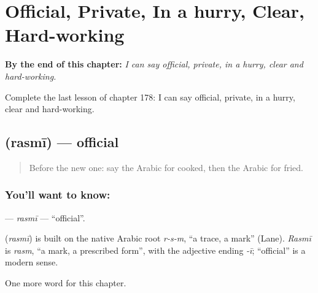 
\chapter{Official, Private, In a hurry, Clear, Hard-working}
\label{ch:ar-official-private-in-a-hurry-clear-hard-working}

\begin{chapteropening}
\textbf{By the end of this chapter:} \emph{I can say official, private, in a hurry, clear and hard-working.}

Complete the last lesson of chapter 178: I can say official, private, in a hurry, clear and hard-working.
\end{chapteropening}

\section[\texorpdfstring{\ar{رسمي} (rasmī)}{رسمي (rasmī)}]{ (rasmī) — official}

\label{lesson:AR-C178-rasmi}



\begin{quote}
Before the new one: say the Arabic for cooked, then the Arabic for fried.
\end{quote}

\subsection*{You'll want to know: }
\textbf{} — \emph{rasmī} — \textquotedblleft{}official\textquotedblright{}.

\begin{cousinweb}
\textbf{} (\emph{rasmī}) is built on the native Arabic root \emph{r-s-m}, \textquotedblleft{}a trace, a mark\textquotedblright{} (Lane). \emph{Rasmī} is \emph{rasm}, \textquotedblleft{}a mark, a prescribed form\textquotedblright{}, with the adjective ending \emph{-ī}; \textquotedblleft{}official\textquotedblright{} is a modern sense.
\end{cousinweb}

\begin{grammarlens}[title={What you've built}]
One more word for this chapter.
\end{grammarlens}

